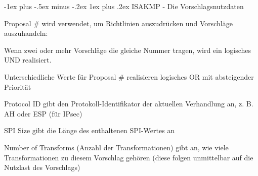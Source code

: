 \documentclass[a4paper]{article}
\makeatletter
\renewcommand{\subsubsection}{\@startsection{subsubsection}{3}{0mm}%
 {-1ex plus -.5ex minus -.2ex}%
 {1ex plus .2ex}%
 {\normalfont\small\bfseries}}
\makeatother
\begin{document}
\begin{multicols}{3}
\begin{itemize*}
            \subsubsection{ISAKMP - Die
                  Vorschlagsnutzdaten}
            \begin{itemize*}
                  \item       Proposal \# wird verwendet, um Richtlinien auszudrücken und Vorschläge
                  auszuhandeln:
                  \begin{itemize*}
                        \item Wenn zwei oder mehr Vorschläge die gleiche Nummer tragen, wird ein logisches UND realisiert.
                        \item Unterschiedliche Werte für Proposal \# realisieren logisches OR mit absteigender Priorität
                  \end{itemize*}
                  \item       Protocol ID gibt den Protokoll-Identifikator der aktuellen Verhandlung
                  an, z. B. AH oder ESP (für IPsec)
                  \item       SPI Size gibt die Länge des enthaltenen SPI-Wertes an
                  \item       Number of Transforms (Anzahl der Transformationen) gibt an, wie viele
                  Transformationen zu diesem Vorschlag gehören (diese folgen unmittelbar
                  auf die Nutzlast des Vorschlags)
            \end{itemize*}


\end{itemize*}
\end{multicols}
\end{document}
